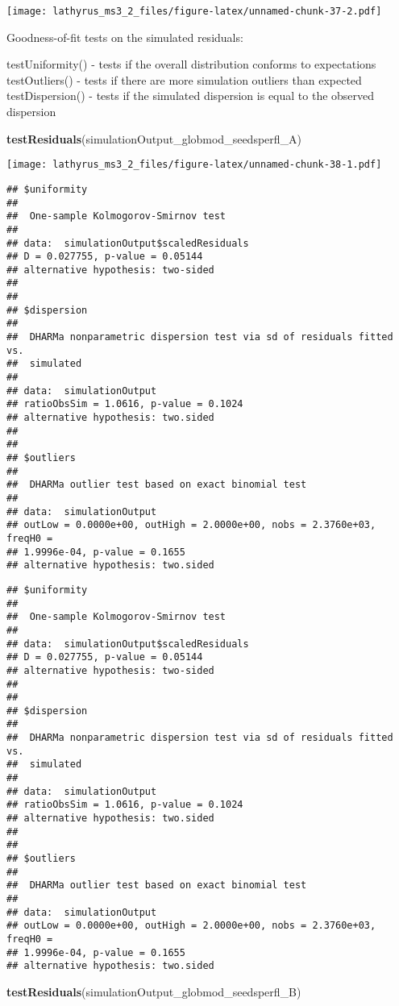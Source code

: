 \documentclass[
]{article}
\newenvironment{Shaded}{\begin{snugshade}}{\end{snugshade}}
\newcommand{\KeywordTok}[1]{\textcolor[rgb]{0.13,0.29,0.53}{\textbf{#1}}}
\newcommand{\NormalTok}[1]{#1}
\begin{document}
\texttt{[image: lathyrus\_ms3\_2\_files/figure-latex/unnamed-chunk-37-2.pdf]}

Goodness-of-fit tests on the simulated residuals:

testUniformity() - tests if the overall distribution conforms to
expectations testOutliers() - tests if there are more simulation
outliers than expected testDispersion() - tests if the simulated
dispersion is equal to the observed dispersion

\begin{Shaded}
\begin{Highlighting}[]
\KeywordTok{testResiduals}\NormalTok{(simulationOutput_globmod_seedsperfl_A)}
\end{Highlighting}
\end{Shaded}

\texttt{[image: lathyrus\_ms3\_2\_files/figure-latex/unnamed-chunk-38-1.pdf]}

\begin{verbatim}
## $uniformity
## 
##  One-sample Kolmogorov-Smirnov test
## 
## data:  simulationOutput$scaledResiduals
## D = 0.027755, p-value = 0.05144
## alternative hypothesis: two-sided
## 
## 
## $dispersion
## 
##  DHARMa nonparametric dispersion test via sd of residuals fitted vs.
##  simulated
## 
## data:  simulationOutput
## ratioObsSim = 1.0616, p-value = 0.1024
## alternative hypothesis: two.sided
## 
## 
## $outliers
## 
##  DHARMa outlier test based on exact binomial test
## 
## data:  simulationOutput
## outLow = 0.0000e+00, outHigh = 2.0000e+00, nobs = 2.3760e+03, freqH0 =
## 1.9996e-04, p-value = 0.1655
## alternative hypothesis: two.sided
\end{verbatim}

\begin{verbatim}
## $uniformity
## 
##  One-sample Kolmogorov-Smirnov test
## 
## data:  simulationOutput$scaledResiduals
## D = 0.027755, p-value = 0.05144
## alternative hypothesis: two-sided
## 
## 
## $dispersion
## 
##  DHARMa nonparametric dispersion test via sd of residuals fitted vs.
##  simulated
## 
## data:  simulationOutput
## ratioObsSim = 1.0616, p-value = 0.1024
## alternative hypothesis: two.sided
## 
## 
## $outliers
## 
##  DHARMa outlier test based on exact binomial test
## 
## data:  simulationOutput
## outLow = 0.0000e+00, outHigh = 2.0000e+00, nobs = 2.3760e+03, freqH0 =
## 1.9996e-04, p-value = 0.1655
## alternative hypothesis: two.sided
\end{verbatim}

\begin{Shaded}
\begin{Highlighting}[]
\KeywordTok{testResiduals}\NormalTok{(simulationOutput_globmod_seedsperfl_B)}
\end{Highlighting}
\end{Shaded}
\end{document}

